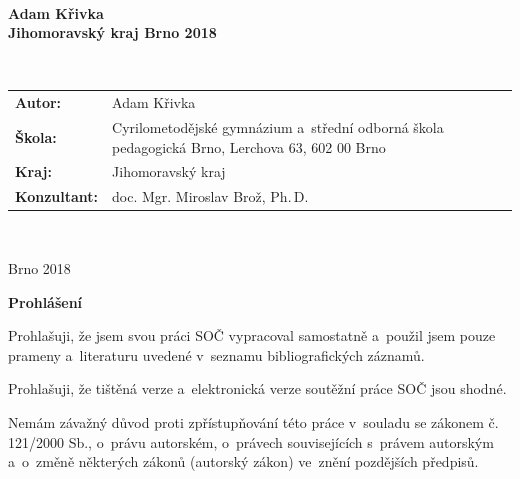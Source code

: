 \documentclass[A4paper, 12pt, oneside, openany]{book}
\begin{document}
\pagestyle{empty}
\begin{center}
	{\fontsize{18pt}{22pt}\selectfont {}} \\
	{\fontsize{14pt}{17pt}\selectfont {}}
\end{center}
\vfill
\begin{center}
	{\fontsize{20pt}{26pt}\selectfont {}}
\end{center}
\vfill
{\large \bfseries Adam Křivka \\
	Jihomoravský kraj \hfill Brno 2018}
\newpage

\begin{center}
	{\fontsize{18pt}{22pt}\selectfont {}} \\
	{\fontsize{14pt}{17pt}\selectfont {}}
\end{center}
\vfill
\begin{center}
	{\fontsize{20pt}{26pt}\selectfont {}}

	 {\fontsize{20pt}{26pt}\selectfont {}}
\end{center}
\vfill
\begin{tabularx}{\textwidth}{lX}
	{\bfseries Autor:} & Adam Křivka \\
	{\bfseries Škola:} & Cyrilometodějské gymnázium a~střední odborná škola pedagogická Brno, Lerchova 63, 602 00 Brno \\
	{\bfseries Kraj:} & Jihomoravský kraj \\
	{\bfseries Konzultant:} & doc. Mgr. Miroslav Brož, Ph.\,D.
\end{tabularx}

\

\noindent Brno 2018

\newpage

{\large \bfseries Prohlášení}

Prohlašuji, že jsem svou práci SOČ vypracoval samostatně a~použil jsem pouze prameny a~literaturu uvedené v~seznamu bibliografických záznamů.

Prohlašuji, že tištěná verze a~elektronická verze soutěžní práce SOČ jsou shodné. 

Nemám závažný důvod proti zpřístupňování této práce v~souladu se zákonem č. 121/2000 Sb., o~právu autorském, o~právech souvisejících s~právem autorským a~o~změně některých zákonů (autorský zákon) ve~znění pozdějších předpisů. 
\end{document}
